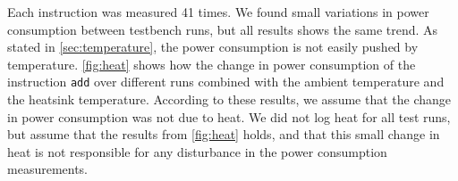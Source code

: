 Each instruction was measured 41 times. We found small variations in power
consumption between testbench runs, but all results shows the same trend.  As
stated in \autoref{sec:temperature}, the power consumption is not easily pushed
by temperature. \autoref{fig:heat} shows how the change in power consumption of
the instruction \texttt{add} over different runs combined with the ambient
temperature and the heatsink temperature. According to these results, we assume
that the change in power consumption was not due to heat. We did not log heat
for all test runs, but assume that the results from \autoref{fig:heat} holds,
and that this small change in heat is not responsible for any disturbance in the
power consumption measurements.
